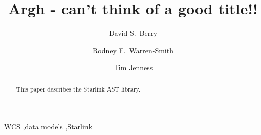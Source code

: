 \documentclass[final,authoryear,5p,times,twocolumn]{elsarticle}
\begin{document}
\begin{frontmatter}



\title{Argh - can't think of a good title!!}


\author[jac]{David S.\ Berry}
\author[ral]{Rodney F.\ Warren-Smith}
\author[cornell]{Tim Jenness}


\address[jac]{Joint Astronomy Centre, 660 N.\ A`oh\=ok\=u Place, Hilo, HI
  96720, USA}
\address[ral]{RAL Space, STFC Rutherford Appleton Laboratory, Harwell Oxford, Didcot, Oxfordshire OX11 0QX, UK}
\address[cornell]{Department of Astronomy, Cornell University, Ithaca,
  NY 14853, USA}

\begin{abstract}
This paper describes the Starlink AST library.
\end{abstract}

\begin{keyword}


WCS \sep data models \sep Starlink

\end{keyword}

\end{frontmatter}

\end{document}
